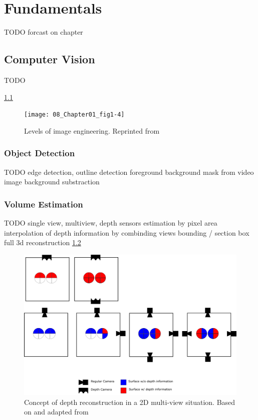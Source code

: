 \chapter{Fundamentals}
\label{chap:sota}

TODO forcast on chapter

\section{Computer Vision}

TODO

\ref{fig:sota:imageengineering}
\begin{figure}[hbt]
	\centering
	\texttt{[image: 08\_Chapter01\_fig1-4]}
	\caption{\label{fig:sota:imageengineering} Levels of image engineering. 
	Reprinted from \textcite[][Chapter~1]{zhang2017imageprocessing}}
\end{figure}

\subsection{Object Detection}

TODO
edge detection, outline detection
foreground background mask from video image
background substraction

\subsection{Volume Estimation}

TODO
single view, multiview, depth sensors
estimation by pixel area
interpolation of depth information by combinding views
bounding / section box
full 3d reconstruction
\ref{fig:sota:mulitviewtop}

\begin{figure}[hbt]
	\centering
	\includegraphics[width=1.0\textwidth, keepaspectratio]{resources/multiview}
	\caption{\label{fig:sota:mulitviewtop}Concept of depth reconstruction in a 2D multi-view situation.
	Based on and adapted from \textcite[][]{sonaten2011volume}}
\end{figure}


